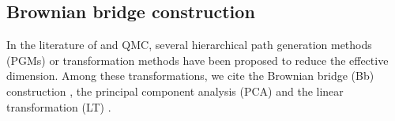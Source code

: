 %
%
%
%

\subsection{Brownian bridge construction}\label{sec:Brwonian bridge construction}
In the literature of  and  QMC, several hierarchical path generation methods (PGMs) or transformation methods have been proposed to reduce the effective dimension. Among these transformations, we cite  the Brownian bridge (Bb)  construction \cite{morokoff1994quasi,moskowitz1996smoothness,caflisch1997valuation}, the principal component analysis (PCA)  \cite{acworth1998comparison} and the linear transformation (LT) \cite{imai2004minimizing}.

